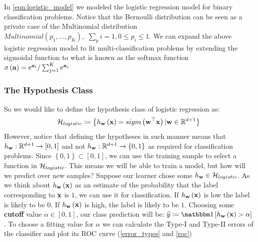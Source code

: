 \begin{remark}
	In \ref{eqn:logistic_model} we modeled the logistic regression model for binary classification problems. Notice that the Bernoulli distribution can be seen as a private case of the Multinomial distribution $Multinomial\left(p_1,\ldots,p_K\right),\,\,\sum_pi=1, 0\leq p_i\leq 1$. We can expand the above logistic regression model to fit multi-classification problems by extending the sigmoidal function to what is known as the softmax function $\sigma\left(\mathbf{a}\right)=e^{\mathbf{a}_i}/\sum^K_{j=1}e^{\mathbf{a}_j}$
\end{remark}

\subsubsection{The Hypothesis Class}
So we would like to define the hypothesis class of logistic regression as: 
\begin{equation}
	\mathcal{H}_{logistic}\coloneqq\left\{h_{\mathbf{w}}\left(\mathbf{x}\right)=sigm\left(\mathbf{w}^\top\mathbf{x}\right)|\mathbf{w}\in\mathbb{R}^{d+1}\right\}
	\label{eqn:logisitc_hypothesis_class}
\end{equation}
However, notice that defining the hypotheses in such manner means that $h_{\mathbf{w}}:\mathbb{R}^{d+1}\rightarrow\left[0,1\right]$ and not $h_{\mathbf{w}}:\mathbb{R}^{d+1}\rightarrow\left\{0,1\right\}$ as required for classification problems. Since $\left\{0,1\right\}\subset\left[0,1\right]$, we can use the training sample to select a function in $\mathcal{H}_{logistic}$. This means we will be able to train a model, but how will we predict over new samples? Suppose our learner chose some $h_{\mathbf{w}}\in\mathcal{H}_{logistic}$. As we think about $h_{\mathbf{w}}\left(\mathbf{x}\right)$ as an estimate of the probability that the label corresponding to $\mathbf{x}$ is $1$, we can use it for classification. If $h_{\mathbf{w}}\left(\mathbf{x}\right)$ is low the label is likely to be $0$. If $h_{\mathbf{w}}\left(\mathbf{x}\right)$ is high, the label is likely to be $1$. Choosing some \textbf{cutoff} value $\alpha\in\left[0,1\right]$, our class prediction will be: $\widehat{y}\coloneqq \indc{h_{\w}\left(\x\right)>\alpha} $. To choose a fitting value for $\alpha$ we can calculate the Type-I and Type-II errors of the classifier and plot its ROC curve (\autoref{error_types} and \autoref{roc})


